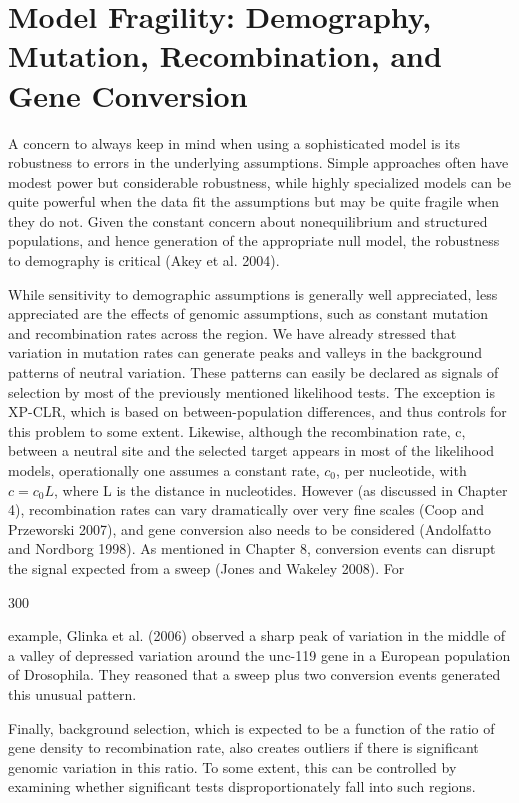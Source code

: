 \documentclass{article}
\begin{document}
\section{Model Fragility: Demography, Mutation, Recombination, and Gene Conversion}
A concern to always keep in mind when using a sophisticated model is its robustness to errors in the underlying assumptions. Simple approaches often have modest power but considerable robustness, while highly specialized models can be quite powerful when the data fit the assumptions but may be quite fragile when they do not. Given the constant concern about nonequilibrium and structured populations, and hence generation of the appropriate null model, the robustness to demography is critical (Akey et al. 2004).

While sensitivity to demographic assumptions is generally well appreciated, less appreciated are the effects of genomic assumptions, such as constant mutation and recombination rates across the region. We have already stressed that variation in mutation rates can generate peaks and valleys in the background patterns of neutral variation. These patterns can easily be declared as signals of selection by most of the previously mentioned likelihood tests. The exception is XP-CLR, which is based on between-population differences, and thus controls for this problem to some extent. Likewise, although the recombination rate, c, between a neutral site and the selected target appears in most of the likelihood models, operationally one assumes a constant rate,  $ c_{0} $, per nucleotide, with  $ c = c_{0}L $, where L is the distance in nucleotides. However (as discussed in Chapter 4), recombination rates can vary dramatically over very fine scales (Coop and Przeworski 2007), and gene conversion also needs to be considered (Andolfatto and Nordborg 1998). As mentioned in Chapter 8, conversion events can disrupt the signal expected from a sweep (Jones and Wakeley 2008). For

300

example, Glinka et al. (2006) observed a sharp peak of variation in the middle of a valley of depressed variation around the unc-119 gene in a European population of Drosophila. They reasoned that a sweep plus two conversion events generated this unusual pattern.

Finally, background selection, which is expected to be a function of the ratio of gene density to recombination rate, also creates outliers if there is significant genomic variation in this ratio. To some extent, this can be controlled by examining whether significant tests disproportionately fall into such regions.
\end{document}
